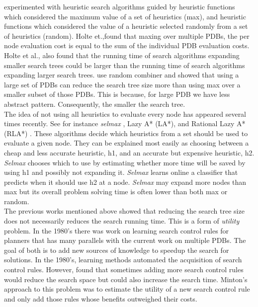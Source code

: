 \documentclass[a4paper,12pt]{article}
\begin{document}
\citep{holte2004multiple} experimented with heuristic search algorithms guided by heuristic functions which considered the maximum value of a set of heuristics (max), and heuristic functions which considered the value of a heuristic selected randomly from a set of heuristics (random). Holte et.,found that maxing over multiple PDBs, the per node evaluation cost is equal to the sum of the individual PDB evaluation costs. Holte et al., also found that the running time of search algorithms expanding smaller search trees could be larger than the running time of search algorithms expanding larger search trees. \citep{zahavi2007inconsistent} use random combiner and showed that using a large set of PDBs can reduce the search tree size more than using max over a smaller subset of those PDBs. This is because, for large PDB we have less abstract pattern. Consequently, the smaller the search tree.\\

The idea of not using all heuristics to evaluate every node has appeared several times recently. See for instance \textit{selmax} \citet{domshlak2011selmax}, Lazy A* (LA*), and Rational Lazy A* (RLA*) \citep{tolpin2013towards}. These algorithms decide which heuristics from a set should be used to evaluate a given node. They can be explained most easily as choosing between a cheap and less accurate heuristic, h1, and an accurate but expensive heuristic, h2. \textit{Selmax} chooses which to use by estimating whether more time will be saved by using h1 and possibly not expanding it. \textit{Selmax} learns online a classifier that predicts when it should use h2 at a node. \textit{Selmax} may expand more nodes than max but its overall problem solving time is often lower than both max or random.\\

The previous works mentioned above showed that reducing the search tree size does not necessarily reduces the search running time. This is a form of \textit{utility} problem. In the 1980's there was work on learning search control rules for planners that has many parallels with the current work on multiple PDBs. The goal of both is to add new sources of knowledge to speedup the search for solutions. In the 1980's, learning methods automated the acquisition of search control rules. However, \citep{Minton1990363} found that sometimes adding more search control rules would reduce the search space but could also increase the search time. Minton's approach to this problem was to estimate the utility of a new search control rule and only add those rules whose benefits outweighed their costs.\\
\end{document}
